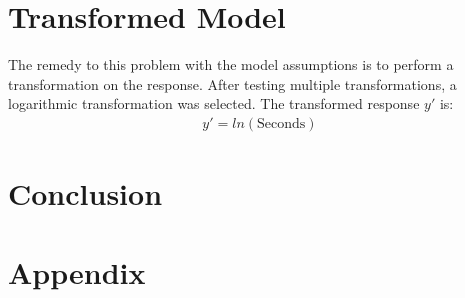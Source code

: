\documentclass{article}
\begin{document}
\clearpage
\section{Transformed Model}
The remedy to this problem with the model assumptions is to perform a transformation on the response.
After testing multiple transformations, a logarithmic transformation was selected.
The transformed response $y'$ is:
\begin{align*}
  y' = ln(\text{Seconds})
\end{align*}


\clearpage
\section{Conclusion}


\clearpage
\appendix
\section{Appendix}
\end{document}
